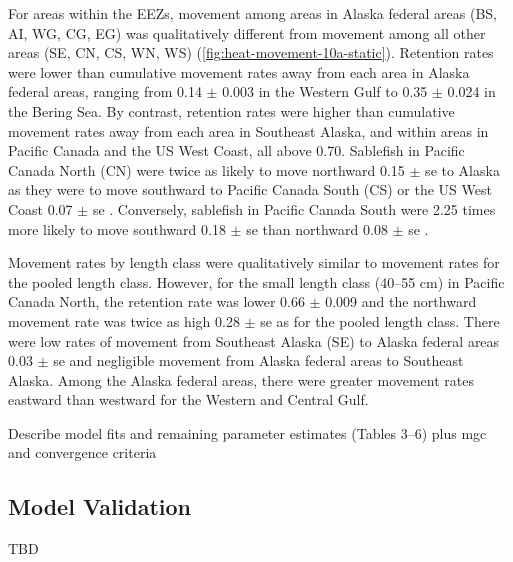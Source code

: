 \documentclass{article}
\newcommand{\lr}[1]{{\color{blue}#1}}
\begin{document}
For areas within the EEZs, movement among areas in Alaska federal areas (BS, AI, WG, CG, EG) was qualitatively different from movement among all other areas (SE, CN, CS, WN, WS) (\autoref{fig:heat-movement-10a-static}). Retention rates were lower than cumulative movement rates away from each area in Alaska federal areas, ranging from \num{0.14} $\pm$ \num{0.003}  in the Western Gulf to  \num{0.35} $\pm$ \num{0.024}  in the Bering Sea. By contrast, retention rates were higher than cumulative movement rates away from each area in Southeast Alaska, and within areas in Pacific Canada and the US West Coast, all above \num{0.70}. Sablefish in Pacific Canada North (CN) were twice as likely to move northward \num{0.15} $\pm$ \lr{se}  to Alaska as they were to move southward to Pacific Canada South (CS) or the US West Coast \num{0.07} $\pm$ \lr{se} . Conversely, sablefish in Pacific Canada South were \num{2.25} times more likely to move southward \num{0.18} $\pm$ \lr{se}  than northward \num{0.08} $\pm$ \lr{se} .

Movement rates by length class were qualitatively similar to movement rates for the pooled length class. However, for the small length class (\num{40}--\num{55} cm) in Pacific Canada North, the retention rate was lower \num{0.66} $\pm$ \num{0.009}  and the northward movement rate was twice as high \num{0.28} $\pm$ \lr{se}  as for the pooled length class. There were low rates of movement from Southeast Alaska (SE) to Alaska federal areas \num{0.03} $\pm$ \lr{se}  and negligible movement from Alaska federal areas to Southeast Alaska. Among the Alaska federal areas, there were greater movement rates eastward than westward for the Western and Central Gulf.

\lr{Describe model fits and remaining parameter estimates (Tables 3--6) plus mgc and convergence criteria}

\subsection{Model Validation}

\lr{TBD}
\end{document}
